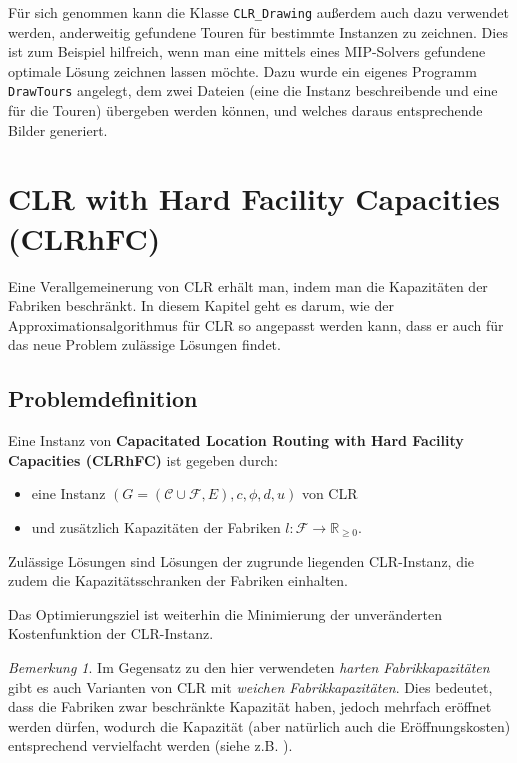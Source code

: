 \documentclass[a4paper,ngerman,11pt,bibtotoc]{scrartcl}
\theoremstyle{definition}
\theoremstyle{plain}
\theoremstyle{remark}
\newtheorem{bem}[defn]{Bemerkung}
\newcommand{\IR}{\mathbb{R}}
\newcommand{\ClientSet}{\mathscr{C}}
\newcommand{\FacilitySet}{\mathscr{F}}
\newcommand{\CLR}{CLR}
\newcommand{\CLRHFC}{CLRhFC}
\begin{document}
Für sich genommen kann die Klasse \lstinline|CLR_Drawing| außerdem auch dazu verwendet werden, anderweitig gefundene Touren für bestimmte Instanzen zu zeichnen. Dies ist zum Beispiel hilfreich, wenn man eine mittels eines MIP-Solvers gefundene optimale Lösung zeichnen lassen möchte. Dazu wurde ein eigenes Programm \lstinline|DrawTours| angelegt, dem zwei Dateien (eine die Instanz beschreibende und eine für die Touren) übergeben werden können, und welches daraus entsprechende Bilder generiert.


\newpage

\section{\CLR{} with Hard Facility Capacities (\CLRHFC)}

Eine Verallgemeinerung von \CLR{} erhält man, indem man die Kapazitäten der Fabriken beschränkt. In diesem Kapitel geht es darum, wie der Approximationsalgorithmus für \CLR{} so angepasst werden kann, dass er auch für das neue Problem zulässige Lösungen findet.

	\subsection{Problemdefinition}\label{sec:CLRHFC-Def}

Eine Instanz von \textbf{Capacitated Location Routing with Hard Facility Capacities (\CLRHFC)} ist gegeben durch:
\begin{itemize}
	\item eine Instanz $(G=(\ClientSet\cup\FacilitySet,E), c,\phi,d,u)$ von \CLR
	\item und zusätzlich Kapazitäten der Fabriken $l: \FacilitySet \to \IR_{\geq 0}$.
\end{itemize}
Zulässige Lösungen sind Lösungen der zugrunde liegenden \CLR-Instanz, die zudem die Kapazitätsschranken der Fabriken einhalten.

Das Optimierungsziel ist weiterhin die Minimierung der unveränderten Kostenfunktion der \CLR-Instanz.

\begin{bem}
Im Gegensatz zu den hier verwendeten \emph{harten Fabrikkapazitäten} gibt es auch Varianten von \CLR{} mit \emph{weichen Fabrikkapazitäten}. Dies bedeutet, dass die Fabriken zwar beschränkte Kapazität haben, jedoch mehrfach eröffnet werden dürfen, wodurch die Kapazität (aber natürlich auch die Eröffnungskosten) entsprechend vervielfacht werden (siehe z.B. \cite{SoftCap1}).  
\end{bem}
\end{document}
